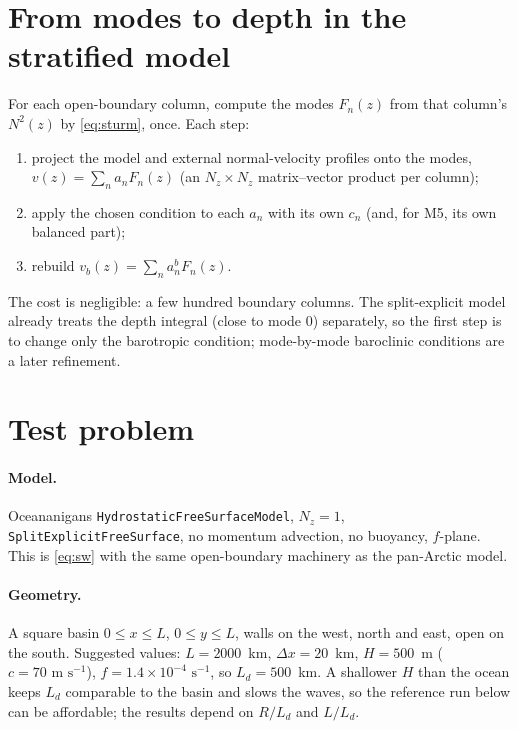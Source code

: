 \documentclass[11pt]{article}
\begin{document}
\section{From modes to depth in the stratified model}

For each open-boundary column, compute the modes $F_n(z)$ from that column's $N^2(z)$ by \eqref{eq:sturm}, once.
Each step:
\begin{enumerate}
  \item project the model and external normal-velocity profiles onto the modes,
        $v(z)=\sum_n a_n F_n(z)$ (an $N_z\times N_z$ matrix--vector product per column);
  \item apply the chosen condition to each $a_n$ with its own $c_n$ (and, for M5, its own balanced part);
  \item rebuild $v_b(z)=\sum_n a_n^b F_n(z)$.
\end{enumerate}
The cost is negligible: a few hundred boundary columns. The split-explicit model already treats the depth integral
(close to mode 0) separately, so the first step is to change only the barotropic condition; mode-by-mode
baroclinic conditions are a later refinement.

\section{Test problem}

\paragraph{Model.} Oceananigans \texttt{HydrostaticFreeSurfaceModel}, $N_z=1$, \texttt{SplitExplicitFreeSurface},
no momentum advection, no buoyancy, $f$-plane. This is \eqref{eq:sw} with the same open-boundary machinery as the
pan-Arctic model.

\paragraph{Geometry.} A square basin $0\le x\le L$, $0\le y\le L$, walls on the west, north and east, open on the
south. Suggested values: $L=2000$~km, $\Delta x=20$~km, $H=500$~m ($c=70\text{ m s}^{-1}$),
$f=1.4\times10^{-4}\text{ s}^{-1}$, so $L_d=500$~km. A shallower $H$ than the ocean keeps $L_d$ comparable to the
basin and slows the waves, so the reference run below can be affordable; the results depend on $R/L_d$ and
$L/L_d$.
\end{document}
